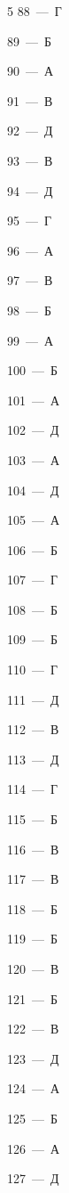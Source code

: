 \documentclass[12pt]{article}
\begin{document}
\begin{multicols}{5}
\mbox{88~--- Г}\par
\mbox{89~--- Б}\par
\mbox{90~--- А}\par
\mbox{91~--- В}\par
\mbox{92~--- Д}\par
\mbox{93~--- В}\par
\mbox{94~--- Д}\par
\mbox{95~--- Г}\par
\mbox{96~--- А}\par
\mbox{97~--- В}\par
\mbox{98~--- Б}\par
\mbox{99~--- А}\par
\mbox{100~--- Б}\par
\mbox{101~--- А}\par
\mbox{102~--- Д}\par
\mbox{103~--- А}\par
\mbox{104~--- Д}\par
\mbox{105~--- А}\par
\mbox{106~--- Б}\par
\mbox{107~--- Г}\par
\mbox{108~--- Б}\par
\mbox{109~--- Б}\par
\mbox{110~--- Г}\par
\mbox{111~--- Д}\par
\mbox{112~--- В}\par
\mbox{113~--- Д}\par
\mbox{114~--- Г}\par
\mbox{115~--- Б}\par
\mbox{116~--- В}\par
\mbox{117~--- В}\par
\mbox{118~--- Б}\par
\mbox{119~--- Б}\par
\mbox{120~--- В}\par
\mbox{121~--- Б}\par
\mbox{122~--- В}\par
\mbox{123~--- Д}\par
\mbox{124~--- А}\par
\mbox{125~--- Б}\par
\mbox{126~--- А}\par
\mbox{127~--- Д}
\end{multicols}
\end{document}
